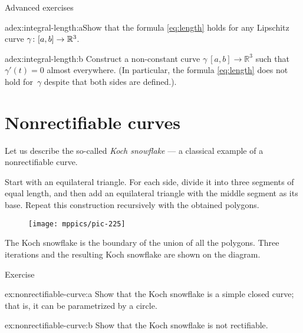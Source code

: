 \begin{thm}{Advanced exercises}\label{adex:integral-length}

\begin{subthm}{adex:integral-length:a}Show that the formula \ref{eq:length} holds for any Lipschitz curve $\gamma\:[a,b]\z\to\mathbb{R}^3$.
\end{subthm}

\begin{subthm}{adex:integral-length:b}
Construct a non-constant curve $\gamma\:[a,b]\to\mathbb{R}^3$ such that $\gamma'(t)=0$ almost everywhere.
(In particular, the formula \ref{eq:length} does not hold for~$\gamma$ despite that both sides are defined.).
\end{subthm}

\end{thm}


\section{Nonrectifiable curves}

Let us describe the so-called \emph{Koch snowflake} ---
a classical example of a nonrectifiable curve.

Start with an equilateral triangle.
For each side, divide it into three segments of equal length, and then add an equilateral triangle with the middle segment as its base.
Repeat this construction recursively with the obtained polygons.
\begin{figure}[ht!]
\centering
\texttt{[image: mppics/pic-225]}
\end{figure}
The Koch snowflake is the boundary of the union of all the polygons.
Three iterations and the resulting Koch snowflake are shown on the diagram.



\begin{thm}{Exercise}\label{ex:nonrectifiable-curve}

\begin{subthm}{ex:nonrectifiable-curve:a} Show that the Koch snowflake is a simple closed curve; that is, it can be parametrized by a circle.
\end{subthm}


\begin{subthm}{ex:nonrectifiable-curve:b} Show that the Koch snowflake is not rectifiable. 
\end{subthm}
\end{thm}
  
